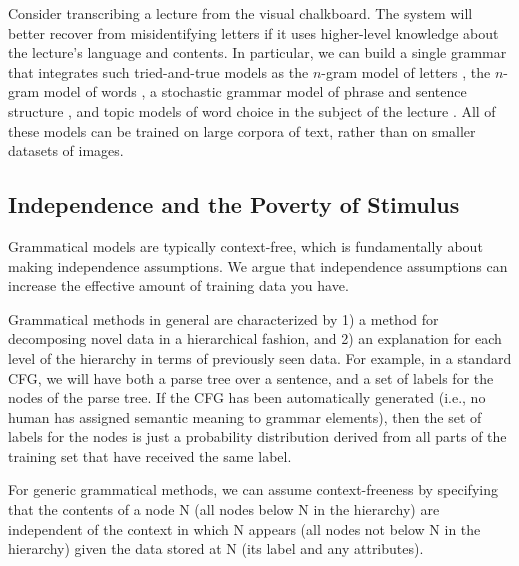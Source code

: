 Consider transcribing a lecture from the visual chalkboard. The system
will better recover from misidentifying letters if it uses
higher-level knowledge about the lecture's language and contents. In
particular, we can build a single grammar that integrates such
tried-and-true models as the $n$-gram model of letters
\cite{manning-schutze}, the $n$-gram model of words
\cite{manning-schutze}, a stochastic grammar model of phrase and
sentence structure \cite{manning-schutze}, and topic models of word
choice in the subject of the lecture \cite{lda}. All of these models
can be trained on large corpora of text, rather than on smaller
datasets of images.



\subsection{Independence and the Poverty of Stimulus}

Grammatical models are typically context-free, which is fundamentally
about making independence assumptions. We argue that independence
assumptions can increase the effective amount of training data you
have.

\begin{rem}
Grammatical methods in general are characterized by 1) a method for
decomposing novel data in a hierarchical fashion, and 2) an
explanation for each level of the hierarchy in terms of previously
seen data. For example, in a standard CFG, we will have both a parse
tree over a sentence, and a set of labels for the nodes of the parse
tree. If the CFG has been automatically generated (i.e., no human has
assigned semantic meaning to grammar elements), then the set of labels
for the nodes is just a probability distribution derived from all
parts of the training set that have received the same label. 

For generic grammatical methods, we can assume context-freeness by
specifying that the contents of a node N (all nodes below N in the
hierarchy) are independent of the context in which N appears (all
nodes not below N in the hierarchy) given the data stored at N (its
label and any attributes).
\end{rem}


